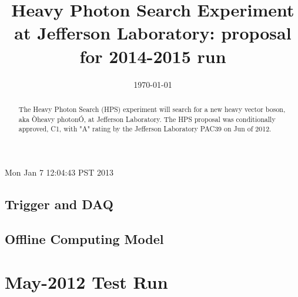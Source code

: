 \documentclass[prc,12pt]{revtex4}
\begin{document}
{\color{red} Mon Jan  7 12:04:43 PST 2013 } %

\title{\bf\large{Heavy Photon Search Experiment at Jefferson Laboratory: proposal for 2014-2015 run}}


\date{\today}

\begin{abstract}
\clearpage

The Heavy Photon Search (HPS) experiment will search for a new heavy vector boson, aka Òheavy photonÓ, at Jefferson Laboratory. The HPS proposal was conditionally approved, C1, with "A" rating by the Jefferson Laboratory PAC39  on Jun of 2012. 

\end{abstract}

\maketitle
\clearpage

\tableofcontents
\clearpage






\clearpage





\clearpage






\clearpage


\clearpage


\clearpage


\clearpage

\subsection{Trigger and DAQ }


\subsection{Offline Computing Model}


\section{May-2012 Test Run}
\label{sec:testrun2012}

\clearpage
\end{document}
